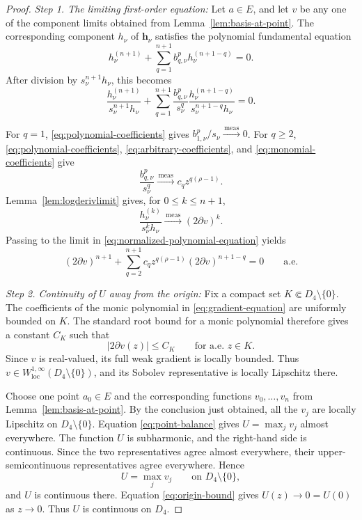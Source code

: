 \documentclass[12pt,letterpaper,reqno]{amsart}
\theoremstyle{definition}
\numberwithin{equation}{section}
\newcommand{\loc}{\mathrm{loc}}
\newcommand{\convmeas}{\xrightarrow{\,\mathrm{meas}\,}}
\newcommand{\hv}{\bm h}
\begin{document}
\begin{proof}

\medskip\noindent
\emph{{Step 1. The limiting first-order equation:}}
Let \(a\in E\), and let \(v\) be any one of the component limits
obtained from Lemma~\ref{lem:basis-at-point}. The corresponding
component \(h_\nu\) of \(\hv_\nu\) satisfies the polynomial
fundamental equation
\[
h_\nu^{(n+1)}
+
\sum_{q=1}^{n+1}
b_{q,\nu}^p h_\nu^{({n+1}-q)}
=
0.
\]
After division by \(s_\nu^{n+1}h_\nu\), this becomes
\begin{equation}\label{eq:normalized-polynomial-equation}
 \frac{h_\nu^{(n+1)}}{s_\nu^{n+1}h_\nu}
 +
 \sum_{q=1}^{n+1}
 \frac{b_{q,\nu}^p}{s_\nu^q}
 \frac{h_\nu^{({n+1}-q)}}{s_\nu^{{n+1}-q}h_\nu}
 =
 0.
\end{equation}

For \(q=1\), \eqref{eq:polynomial-coefficients} gives
\(b_{1,\nu}^p/s_\nu\convmeas0\). For \(q\geq2\),
\eqref{eq:polynomial-coefficients},
\eqref{eq:arbitrary-coefficients}, and
\eqref{eq:monomial-coefficients} give
\[
\frac{b_{q,\nu}^p}{s_\nu^q}
\convmeas
c_qz^{q(\rho-1)}.
\]
Lemma~\ref{lem:logderivlimit} gives, for
\(0\leq k\leq n+1\),
\[
\frac{h_\nu^{(k)}}{s_\nu^kh_\nu}
\convmeas
(2\partial v)^k.
\]
Passing to the limit in
\eqref{eq:normalized-polynomial-equation} yields
\begin{equation}\label{eq:gradient-equation}
 (2\partial v)^{n+1}
 +
 \sum_{q=2}^{n+1}
 c_qz^{q(\rho-1)}
 (2\partial v)^{{n+1}-q}
 =
 0
 \qquad\text{a.e.}
\end{equation}


\medskip\noindent
\emph{{Step 2. Continuity of \(U\) away from the origin:}}
Fix a compact set
\(K\Subset D_4\setminus\{0\}\).
The coefficients of the monic polynomial in
\eqref{eq:gradient-equation} are uniformly bounded on \(K\).
The standard root bound for a monic polynomial therefore gives a
constant \(C_K\) such that
\[
|2\partial v(z)|\leq C_K
\qquad\text{for a.e. }z\in K.
\]
Since \(v\) is real-valued, its full weak gradient is locally bounded.
Thus \(v\in W^{1,\infty}_{\loc}(D_4\setminus\{0\})\), and its
Sobolev representative is locally Lipschitz there.

Choose one point \(a_0\in E\) and the corresponding functions
\(v_0,\ldots,v_{n}\) from
Lemma~\ref{lem:basis-at-point}. By the conclusion just obtained, all
the \(v_j\) are locally Lipschitz on
\(D_4\setminus\{0\}\). Equation \eqref{eq:point-balance} gives
\(U=\max_jv_j\) almost everywhere. The function \(U\) is subharmonic,
and the right-hand side is continuous. Since the two representatives agree
almost everywhere, their upper-semicontinuous representatives agree
everywhere. Hence
\[
U=\max_jv_j
\qquad\text{on }D_4\setminus\{0\},
\]
and \(U\) is continuous there. Equation \eqref{eq:origin-bound} gives
\(U(z)\to0=U(0)\) as \(z\to0\). Thus \(U\) is continuous on \(D_4\).



\end{proof}
\end{document}
